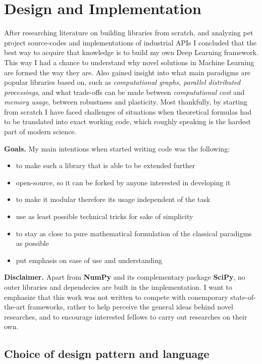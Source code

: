 \chapter{Design and Implementation}

After researching literature on building libraries from scratch, and analyzing pet project source-codes \cite{convnetjs, gibianskysource} and implementations of industrial APIs \cite{TF, caffe, torch}
I concluded that the best way to acquire that knowledge is to build my own Deep Learning framework.
This way I had a chance to understand why novel solutions in Machine Learning are formed the way they are.
Also gained insight into what main paradigms are popular libraries based on, such as \emph{computational graphs, parallel distributed processings}, 
and what trade-offs can be made between \emph{computational cost} and \emph{memory usage}, between robustness and plasticity.
Most thankfully, by starting from scratch I have faced challenges of situations when theoretical formulas had to be translated into exact working code, which roughly speaking is the hardest part of modern science.

\textbf{Goals.} My main intentions when started writing code was the following:
\begin{itemize}
    \item[] to make such a library that is able to be extended further
    \item[] open-source, so it can be forked by anyone interested in developing it
    \item[] to make it modular therefore its usage independent of the task
    \item[] use as least possible technical tricks for sake of simplicity
    \item[] to stay as close to pure mathematical formulation of the classical paradigms as possible
    \item[] put emphasis on ease of use and understanding
\end{itemize}

\textbf{Disclaimer.} Apart from \textbf{NumPy} and its complementary package \textbf{SciPy}, no outer libraries and dependecies are built in the implementation. 
I want to emphasize that this work was not written to compete with conemporary state-of-the-art frameworks, rather to help perceive the general ideas behind novel researches, and to encourage interested fellows to carry out researches on their own.

\section{Choice of design pattern and language}

